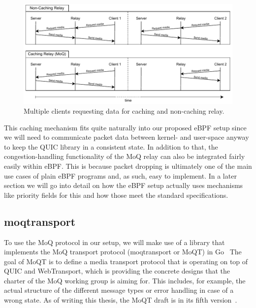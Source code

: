 \vspace{0.5cm}
\begin{figure}[H]
    \centering
    \includegraphics[width=1\linewidth]{figures/02_background/relay-caching.drawio.pdf}
    \caption[Cache related relay traffic]{Multiple clients requesting data for caching and non-caching relay.}\label{fig:relay_caching}
\end{figure}

This caching mechanism fits quite naturally into our proposed eBPF setup since we will need to 
communicate packet data between kernel- and user-space anyway to keep the QUIC library in a 
consistent state.
In addition to that, the congestion-handling functionality of the MoQ relay can also
be integrated fairly easily within eBPF\@.
This is because packet dropping is ultimately one of the main use cases of plain eBPF 
programs and, as such, easy to implement.
In a later section we will go into detail on how the eBPF setup actually uses mechanisms like 
priority fields for this and how those meet the standard specifications.

\subsection{moqtransport}
To use the MoQ protocol in our setup, we will make use of a library that implements 
the MoQ transport protocol (moqtransport or MoQT) in Go~\parencite{priority-moqtransport-repo}
The goal of MoQT is to define a media transport protocol that is operating on top
of QUIC and WebTransport, which is providing the concrete designs that the charter of 
the MoQ working group is aiming for.
This includes, for example, the actual structure of the different message types or error handling in case 
of a wrong state.
As of writing this thesis, the MoQT draft is in its fifth version~\parencite{draft-moqtransport}.

